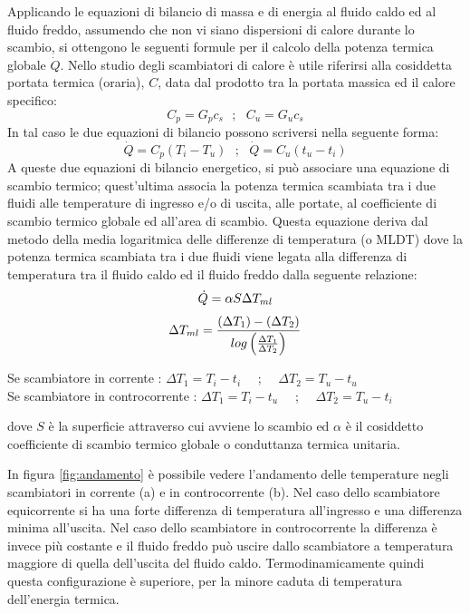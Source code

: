 \documentclass[laurea,oneside,11pt]{USiena_tesiLM}
\begin{document}
Applicando le equazioni di bilancio di massa e di energia al fluido caldo ed al fluido freddo, assumendo che non vi siano dispersioni di calore durante lo scambio, si ottengono le seguenti formule per il calcolo della potenza termica globale $\dot{Q}$. Nello studio degli scambiatori di calore è  utile riferirsi alla cosiddetta portata termica (oraria), $C$, data dal prodotto tra la portata massica ed il calore specifico:
\begin{equation}
C_p=G_p c_s  \ \ \ ; \ \ \ C_u=G_u c_s
\end{equation}
In tal caso le due equazioni di bilancio  possono scriversi nella seguente forma:
\begin{equation}
\dot{Q}=C_p(T_i - T_u) \ \ \ ; \ \ \ \dot{Q}=C_u(t_u - t_i)
\label{eq:scambiatore1}
\end{equation}
A queste due equazioni di bilancio energetico, si può associare una equazione di scambio termico; quest'ultima associa la potenza termica scambiata tra i due fluidi alle temperature di ingresso e/o di uscita, alle portate, al coefficiente di scambio termico globale ed all'area di scambio. Questa equazione deriva dal metodo della media logaritmica delle differenze di temperatura (o MLDT) dove  la potenza termica scambiata tra i due fluidi viene legata alla differenza di temperatura tra il fluido caldo ed il fluido freddo dalla seguente relazione:
\begin{equation}
\dot{Q}=\alpha S \Delta T_{ml} \\
\end{equation}
\begin{equation}
 \Delta T_{ml} = \frac{(\Delta T_1)-(\Delta T_2)}{log\left( \frac{\Delta T_1}{\Delta T_2} \right)} \\
 \label{eq:scambiatore2}
 \end{equation}
 \begin{center}
 Se scambiatore in corrente : $ \Delta T_1 = T_i - t_i $  \ \ ; \ \ $ \Delta T_2 = T_u - t_u $  \\
 
 Se scambiatore in controcorrente : $ \Delta T_1 = T_i - t_u $  \ \ ; \ \ $ \Delta T_2 = T_u - t_i $ 
\end{center}
dove $S$ \`e  la superficie attraverso cui avviene lo scambio ed $\alpha$ \`e  il cosiddetto coefficiente di scambio termico globale o conduttanza termica unitaria. 

In figura \ref{fig:andamento} è  possibile vedere l'andamento delle temperature negli scambiatori in corrente (a) e in controcorrente (b).
Nel caso dello scambiatore equicorrente si ha una forte differenza di temperatura all'ingresso e una differenza  minima  all'uscita.  Nel  caso  dello  scambiatore in controcorrente  la  differenza  è invece più costante e il fluido freddo può uscire dallo scambiatore a temperatura maggiore di  quella  dell'uscita del fluido  caldo. 
Termodinamicamente quindi  questa  configurazione  è superiore, per  la  minore  caduta di temperatura dell'energia termica.
\end{document}
